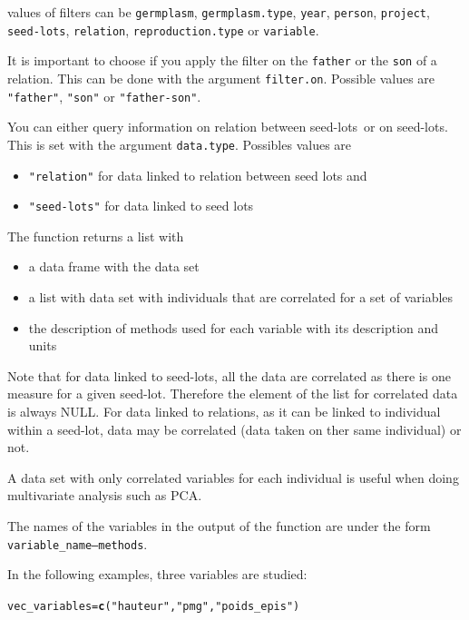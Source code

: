 \documentclass{article}\usepackage[]{graphicx}\usepackage[]{color}
\makeatletter
\newcommand{\hlstr}[1]{\textcolor[rgb]{0.192,0.494,0.8}{#1}}%
\newcommand{\hlstd}[1]{\textcolor[rgb]{0.345,0.345,0.345}{#1}}%
\newcommand{\hlkwb}[1]{\textcolor[rgb]{0.69,0.353,0.396}{#1}}%
\newcommand{\hlkwd}[1]{\textcolor[rgb]{0.737,0.353,0.396}{\textbf{#1}}}%
\newenvironment{kframe}{%
 \def\at@end@of@kframe{}%
 \ifinner\ifhmode%
  \def\at@end@of@kframe{\end{minipage}}%
  \begin{minipage}{\columnwidth}%
 \fi\fi%
 \def\FrameCommand##1{\hskip\@totalleftmargin \hskip-\fboxsep
 \colorbox{shadecolor}{##1}\hskip-\fboxsep
     \hskip-\linewidth \hskip-\@totalleftmargin \hskip\columnwidth}%
 \MakeFramed {\advance\hsize-\width
   \@totalleftmargin\z@ \linewidth\hsize
   \@setminipage}}%
 {\par\unskip\endMakeFramed%
 \at@end@of@kframe}
\newenvironment{knitrout}{}{} %
\renewcommand{\sl}{seed-lots}
\makeatother
\begin{document}
values of filters can be \texttt{germplasm}, \texttt{germplasm.type}, \texttt{year}, \texttt{person}, \texttt{project}, \texttt{\sl}, \texttt{relation}, \texttt{reproduction.type} or \texttt{variable}.


It is important to choose if you apply the filter on the \texttt{father} or the \texttt{son} of a relation.
This can be done with the argument \texttt{filter.on}.
Possible values are \texttt{"father"}, \texttt{"son"} or \texttt{"father-son"}.


You can either query information on relation between \sl~or on \sl.
This is set with the argument \texttt{data.type}.
Possibles values are 

\begin{itemize}
\item \texttt{"relation"} for data linked to relation between seed lots and 
\item \texttt{"seed-lots"} for data linked to seed lots
\end{itemize}


The function returns a list with
\begin{itemize}
\item a data frame with the data set
\item a list with data set with individuals that are correlated for a set of variables
\item the description of methods used for each variable with its description and units
\end{itemize}

Note that for data linked to seed-lots, all the data are correlated as there is one measure for a given seed-lot. 
Therefore the element of the list for correlated data is always NULL.
For data linked to relations, as it can be linked to individual within a seed-lot, data may be correlated (data taken on ther same individual) or not.

A data set with only correlated variables for each individual is useful when doing multivariate analysis such as PCA.

The names of the variables in the output of the function are under the form \texttt{variable\_name---methods}.

\vspace{.5cm}

In the following examples, three variables are studied:

\begin{knitrout}
\color{fgcolor}\begin{kframe}
\begin{alltt}
\hlstd{vec_variables} \hlkwb{=} \hlkwd{c}\hlstd{(}\hlstr{"hauteur"}\hlstd{,} \hlstr{"pmg"}\hlstd{,} \hlstr{"poids_epis"}\hlstd{)}
\end{alltt}
\end{kframe}
\end{knitrout}
\end{document}
